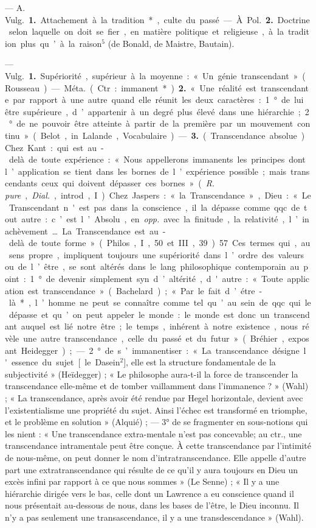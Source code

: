 \begin{itemize}[leftmargin=1cm, label=, itemsep=1pt]
 — A. \si{Vulg.} {\bf 1.} Attachement à la tradition*, culte du
passé. — À. \si{Pol.} {\bf 2.} Doctrine selon
laquelle on doit se fier, en matière
politique et religieuse, à la tradition
plus qu’à la raison$^5$ (de Bonald, de
Maistre, Bautain).

 — \si{Vulg.} {\bf 1.}
Supériorité, supérieur à la moyenne :
« Un génie transcendant » (Rousseau).

— \si{Méta.} (Ctr. : immanent*). {\bf 2.}
« Une réalité est transcendante par
rapport à une autre quand elle réunit
les deux caractères : 1° de lui être
supérieure, d’appartenir à un degré
plus élevé dans une hiérarchie; 2° de
ne pouvoir être atteinte à partir de la
première par un mouvement continu »
(Belot, in Lalande, Vocabulaire). —
 {\bf 3.} (Transcendance absolue). Chez
Kant : qui est au-delà de toute expérience : « Nous appellerons immanents les principes dont l’application se tient dans les bornes de
l’expérience possible; mais transcendants ceux qui doivent dépasser
ces bornes » ({\it R. pure}, {\it Dial.}, introd.,
I). Chez Jaspers : « la Transcendance », Dieu : « Le Transcendant
n'est pas dans la conscience, il la
dépasse comme qqc. de tout autre :
c’est l’Absolu, en {\it opp.} avec la finitude, la relativité, l’inachèvement.…
La Transcendance est au-delà de
toute forme » (Philos., I, 50 et
III, 39). 57 Ces termes qui, au
sens propre, impliquent toujours
une supériorité dans l’ordre des valeurs
ou de l’être, se sont altérés dans
le lang. philosophique contemporain
au point : 1° de devenir simplement syn. d’altérité, d'autre : « Toute
application est transcendance » (Bachelard) ; « Par le fait d’étre-là*,
l’homme ne peut se connaître comme
tel qu’au sein de qqc. qui le dépasse
et qu’on peut appeler le monde : le
monde est donc un transcendant
auquel est lié notre être; le temps,
inhérent à notre existence, nous
révèle une autre transcendance,
celle du passé et du futur » (Bréhier,
exposant Heidegger) ; — 2° de
s’immanentiser : « La transcendance
désigne l'essence du sujet [le Dasein$^2$], elle est la structure fondamentale de la subjectivité » (Heïdegger) ; « Le philosophe aura-t-il la
force de transcender la transcendance elle-même et de tomber vaillamment dans l'immanence ? »
(Wahl) ; « La transcendance, après
avoir été rendue par Hegel horizontale, devient avec l’existentialisme
une propriété du sujet. Ainsi l'échec
est transformé en triomphe, et le
problème en solution » (Alquié) ; —
3° de se fragmenter en sous-notions
qui les nient : « Une transcendance
extra-mentale n’est pas concevable;
au ctr., une transcendance intramentale peut être conçue. À cette
transcendance par l'intimité de
nous-même, on peut donner le nom
d’intratranscendance. Elle appelle
d'autre part une extratranscendance
qui résulte de ce qu’il y aura toujours en Dieu un excès infini par
rapport à ce que nous sommes » (Le
Senne) ; « Il y a une hiérarchie dirigée vers le bas, celle dont un
Lawrence a eu conscience quand il
nous présentait au-dessous de nous,
dans les bases de l'être, le Dieu
inconnu. Il n’y a pas seulement une
transascendance, il y a une transdescendance » (Wahl).


\end{itemize}
